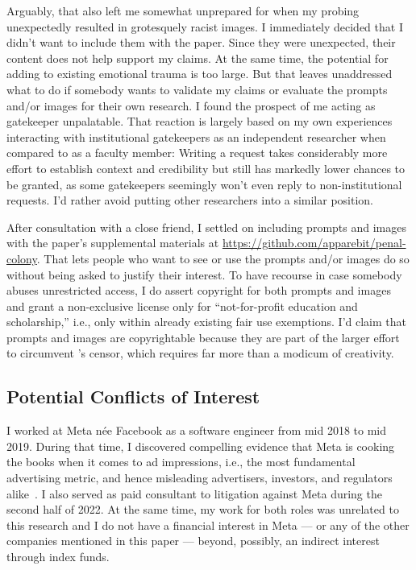 Arguably, that also left me somewhat unprepared for when my probing unexpectedly
resulted in grotesquely racist images. I immediately decided that I didn't want
to include them with the paper. Since they were unexpected, their content does
not help support my claims. At the same time, the potential for adding to
existing emotional trauma is too large. But that leaves unaddressed what to do
if somebody wants to validate my claims or evaluate the prompts and/or images
for their own research. I found the prospect of me acting as gatekeeper
unpalatable. That reaction is largely based on my own experiences interacting
with institutional gatekeepers as an independent researcher when compared to as
a faculty member: Writing a request takes considerably more effort to establish
context and credibility but still has markedly lower chances to be granted, as
some gatekeepers seemingly won't even reply to non-institutional requests. I'd
rather avoid putting other researchers into a similar position.

After consultation with a close friend, I settled on including prompts and
images with the paper's supplemental materials at
\url{https://github.com/apparebit/penal-colony}. That lets people who want to
see or use the prompts and/or images do so without being asked to justify their
interest. To have recourse in case somebody abuses unrestricted access, I do
assert copyright for both prompts and images and grant a non-exclusive license
only for ``not-for-profit education and scholarship,'' i.e., only within already
existing fair use exemptions. I'd claim that prompts and images are
copyrightable because they are part of the larger effort to circumvent \DALLE's
censor, which requires far more than a modicum of creativity.


\subsection{Potential Conflicts of Interest}

I worked at Meta n\'ee Facebook as a software engineer from mid 2018 to mid
2019. During that time, I discovered compelling evidence that Meta is cooking
the books when it comes to ad impressions, i.e., the most fundamental
advertising metric, and hence misleading advertisers, investors, and regulators
alike~\cite{grimm2022a}. I also served as paid consultant to litigation against
Meta during the second half of 2022. At the same time, my work for both roles
was unrelated to this research and I do not have a financial interest in Meta
--- or any of the other companies mentioned in this paper --- beyond, possibly,
an indirect interest through index funds.
